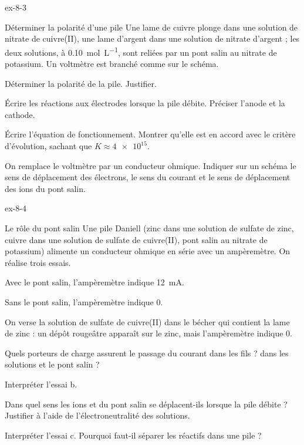 \begin{blocLivre}{ex-8-3}
\begin{exercice}[1]{Déterminer la polarité d'une pile}
Une lame de cuivre plonge dans une solution de nitrate de cuivre(II), une lame d'argent dans une solution de nitrate
d'argent ; les deux solutions, à \qty{0,10}{mol.L^{-1}}, sont reliées par un pont salin au nitrate de potassium. Un
voltmètre est branché comme sur le schéma.
\begin{questions}
\item Déterminer la polarité de la pile. Justifier.
\item Écrire les réactions aux électrodes lorsque la pile débite. Préciser l'anode et la cathode.
\item Écrire l'équation de fonctionnement. Montrer qu'elle est en accord avec le critère d'évolution, sachant que
$K\approx\num{4e15}$.
\item On remplace le voltmètre par un conducteur ohmique. Indiquer sur un schéma le sens de déplacement des électrons,
le sens du courant et le sens de déplacement des ions du pont salin.
\end{questions}
\end{exercice}
\end{blocLivre}
\begin{blocLivre}{ex-8-4}
\begin{exercice}[1]{Le rôle du pont salin}
Une pile Daniell (zinc dans une solution de sulfate de zinc, cuivre dans une solution de sulfate de cuivre(II), pont
salin au nitrate de potassium) alimente un conducteur ohmique en série avec un ampèremètre. On réalise trois essais.
\begin{questions}[label=\otLabel{\alph*.},leftmargin=1.9em,itemsep=0pt,parsep=0.15em]
\item Avec le pont salin, l'ampèremètre indique \qty{12}{mA}.
\item Sans le pont salin, l'ampèremètre indique 0.
\item On verse la solution de sulfate de cuivre(II) dans le bécher qui contient la lame de zinc : un dépôt rougeâtre
apparaît sur le zinc, mais l'ampèremètre indique 0.
\end{questions}
\begin{questions}
\item Quels porteurs de charge assurent le passage du courant dans les fils ? dans les solutions et le pont salin ?
\item Interpréter l'essai b.
\item Dans quel sens les ions  et  du pont salin se déplacent-ils lorsque la pile débite ? Justifier à
l'aide de l'électroneutralité des solutions.
\item Interpréter l'essai c. Pourquoi faut-il séparer les réactifs dans une pile ?
\end{questions}
\end{exercice}
\end{blocLivre}
